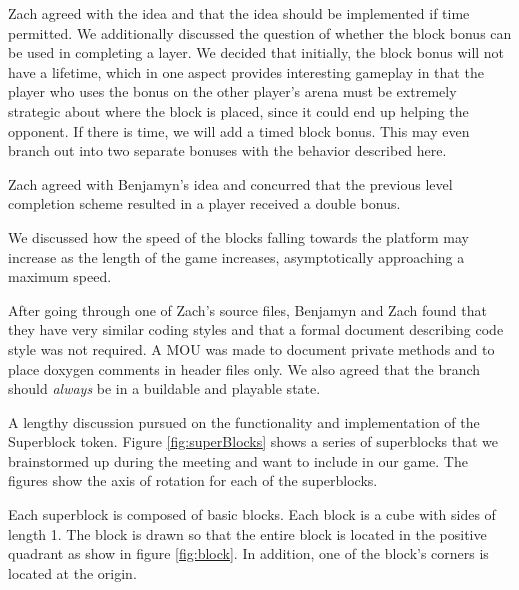 
Zach agreed with the idea and that the idea should be implemented if time
permitted. We additionally discussed the question of whether the block bonus
can be used in completing a layer. We decided that initially, the block bonus
will not have a lifetime, which in one aspect provides interesting gameplay in
that the player who uses the bonus on the other player's arena must be
extremely strategic about where the block is placed, since it could end up
helping the opponent. If there is time, we will add a timed block bonus. This
may even branch out into two separate bonuses with the behavior described here.



Zach agreed with Benjamyn's idea and concurred that the previous level
completion scheme resulted in a player received a double bonus.

We discussed how the speed of the blocks falling towards the platform may
increase as the length of the game increases, asymptotically approaching a
maximum speed.

After going through one of Zach's source files, Benjamyn and Zach found that
they have very similar coding styles and that a formal document describing code
style was not required. A MOU was made to document private methods and to place
doxygen comments in header files only. We also agreed that the 
branch should \emph{always} be in a buildable and playable state.


A lengthy discussion pursued on the functionality and implementation of the
Superblock token. Figure \ref{fig:superBlocks} shows a series of superblocks
that we brainstormed up during the meeting and want to include in our game. The
figures show the axis of rotation for each of the superblocks.

Each superblock is composed of basic blocks. Each block is a cube with sides of
length 1. The block is drawn so that the entire block is located in the
positive quadrant as show in figure \ref{fig:block}. In addition, one of the
block's corners is located at the origin. 

